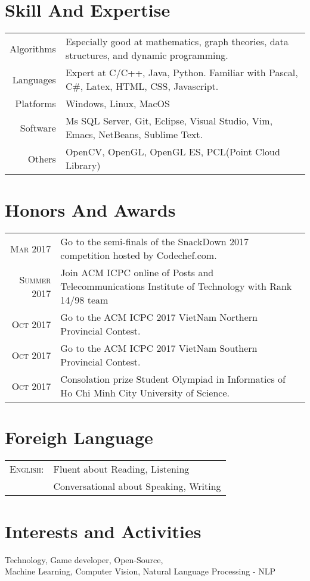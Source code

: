 \documentclass[a4paper,10pt]{article}
\begin{document}
\section{Skill And Expertise}
\begin{tabular}{rl}
 \textsc{}Algorithms & Especially good at mathematics, graph theories, data structures, and dynamic programming.\\
\textsc{}Languages & Expert at C/C++, Java, Python. Familiar with Pascal, C\#, Latex, HTML, CSS, Javascript.\\
\textsc{}Platforms & Windows, Linux, MacOS\\
\textsc{} Software & Ms SQL Server, Git, Eclipse, Visual Studio, Vim, Emacs, NetBeans, Sublime Text.\\
\textsc{} Others & OpenCV, OpenGL, OpenGL ES, PCL(Point Cloud Library)\\
\end{tabular}

\section{Honors And Awards}
\begin{tabular}{rl}
 \textsc{Mar} 2017 & Go to the semi-finals of the SnackDown 2017 competition hosted by Codechef.com.\\
\textsc{Summer} 2017 & Join ACM ICPC online of Posts and Telecommunications Institute of Technology with Rank 14/98 team\\
\textsc{Oct} 2017 & Go to the ACM ICPC 2017 VietNam Northern Provincial Contest.\\
\textsc{Oct} 2017 & Go to the ACM ICPC 2017 VietNam Southern Provincial Contest.\\
\textsc{Oct} 2017 & Consolation prize Student Olympiad in Informatics of Ho Chi Minh City University of Science.\\

\end{tabular}

\section{Foreigh Language}
\begin{tabular}{rl}
\textsc{English:}&Fluent about Reading, Listening\\
& Conversational about Speaking, Writing
\end{tabular}

\section{Interests and Activities}
Technology, Game developer, Open-Source,\\
Machine Learning, Computer Vision, Natural Language Processing - NLP\\
\end{document}
